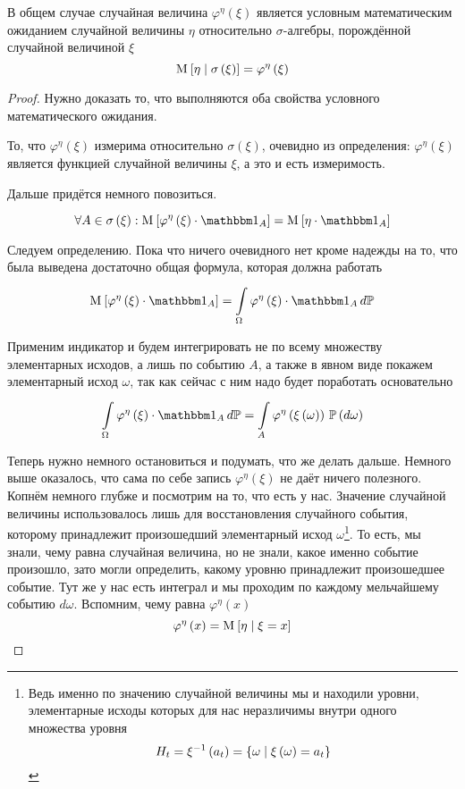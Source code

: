 \begin{lemma}
    В общем случае случайная величина $\varphi^{\eta}\left( \xi \right)$
    является условным математическим ожиданием случайной величины $\eta$
    относительно $\sigma$-алгебры, порождённой случайной величиной $\xi$
    $$\operatorname{M}_{} \left[  \eta \;\middle|\; \sigma\left( \xi \right)  \right]
        = \varphi^{\eta}\left( \xi \right)$$
\end{lemma}
\begin{proof}
Нужно доказать то, что выполняются оба свойства
условного математического ожидания.

То, что $\varphi^{\eta}\left( \xi \right)$ измерима
относительно $\sigma\left( \xi \right)$,
очевидно из определения: $\varphi^{\eta}\left( \xi \right)$ является функцией
случайной величины $\xi$, а это и есть измеримость.

Дальше придётся немного повозиться.

$$\forall A \in \sigma\left( \xi \right):
    \Mean{ \varphi^{\eta}\left( \xi \right) \cdot \indicatorof{A} }
        =\Mean{ \eta \cdot \indicatorof{A} }$$

Следуем определению. Пока что ничего очевидного нет кроме надежды на то,
что была выведена достаточно общая формула, которая должна работать
$$\Mean{ \varphi^{\eta}\left( \xi \right) \cdot \indicatorof{A} }
    = \integrall{\Omega}{d\mathbb{P}}{
    \varphi^{\eta}\left( \xi \right) \cdot \indicatorof{A}}$$

Применим индикатор и будем интегрировать
не по всему множеству элементарных исходов, а лишь по событию $A$,
а также в явном виде покажем элементарный исход $\omega$,
так как сейчас с ним надо будет поработать основательно
\begin{equation}\label{conditionalExpectationIntegralStart}
    \integrall{\Omega}{d\mathbb{P}}{
        \varphi^{\eta}\left( \xi \right) \cdot \indicatorof{A}}
    = \integrall{A}{\probability{d\omega}}{
        \varphi^{\eta}\left( \xi\left( \omega \right) \right)}
\end{equation}

Теперь нужно немного остановиться и подумать, что же делать дальше.
Немного выше оказалось, что сама по себе запись
$\varphi^{\eta}\left( \xi \right)$ не даёт ничего полезного.
Копнём немного глубже и посмотрим на то, что есть у нас.
Значение случайной величины использовалось лишь
для восстановления случайного события,
которому принадлежит произошедший элементарный исход $\omega$\footnote{Ведь
именно по значению случайной величины мы и находили уровни, элементарные исходы
которых для нас неразличимы внутри одного множества уровня
$$H_t = \xi^{-1}\left( a_t \right)
    = \left\{ \omega \;\middle|\; \xi\left( \omega \right) = a_t \right\}$$}.
То есть, мы знали, чему равна случайная величина,
но не знали, какое именно событие произошло,
зато могли определить, какому уровню принадлежит произошедшее событие.
Тут же у нас есть интеграл
и мы проходим по каждому мельчайшему событию $d\omega$.
Вспомним, чему равна $\varphi^{\eta}\left( x \right)$
$$\varphi^{\eta}\left( x \right) = \operatorname{M}_{} \left[ \eta \;\middle|\; \xi = x \right]$$


\end{proof}
